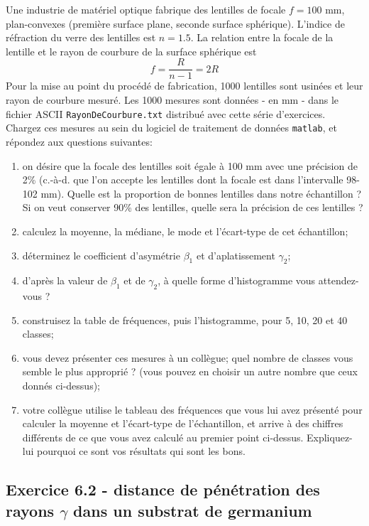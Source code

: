 Une industrie de matériel optique fabrique des lentilles de focale $f=100$ mm, plan-convexes (première surface plane, seconde surface sphérique). L'indice de réfraction du verre des lentilles est $n=1.5$. La relation entre la focale de la lentille et le rayon de courbure de la surface sphérique est
$$
    f=\frac{R}{n-1}=2R
$$
Pour la mise au point du procédé de fabrication, 1000 lentilles sont usinées et leur rayon de courbure mesuré. Les 1000 mesures sont données - en mm - dans le fichier ASCII \texttt{RayonDeCourbure.txt} distribué avec cette série d'exercices. Chargez ces mesures au sein du logiciel de traitement de données \texttt{matlab}, et répondez aux questions suivantes:
\begin{enumerate}
    \item on désire que la focale des lentilles soit égale à 100 mm avec une précision de 2\% (c.-à-d. que l'on accepte les lentilles dont la focale est dans l'intervalle 98-102 mm). Quelle est la proportion de bonnes lentilles dans notre échantillon ? Si on veut conserver 90\% des lentilles, quelle sera la précision de ces lentilles ?
    \item calculez la moyenne, la médiane, le mode et l'écart-type de cet échantillon;
    \item déterminez le coefficient d'asymétrie $\beta_1$ et d'aplatissement $\gamma_2$;
    \item d'après la valeur de $\beta_1$ et de $\gamma_2$, à quelle forme d'histogramme vous attendez-vous ?
    \item construisez la table de fréquences, puis l'histogramme, pour 5, 10, 20 et 40 classes;
    \item vous devez présenter ces mesures à un collègue; quel nombre de classes vous semble le plus approprié ? (vous pouvez en choisir un autre nombre que ceux donnés ci-dessus);
    \item votre collègue utilise le tableau des fréquences que vous lui avez présenté pour calculer la moyenne et l'écart-type de l'échantillon, et arrive à des chiffres différents de ce que vous avez calculé au premier point ci-dessus. Expliquez-lui pourquoi ce sont vos résultats qui sont les bons.
\end{enumerate}

\subsection*{Exercice 6.2 - distance de pénétration des rayons $\gamma$ dans un substrat de germanium}

